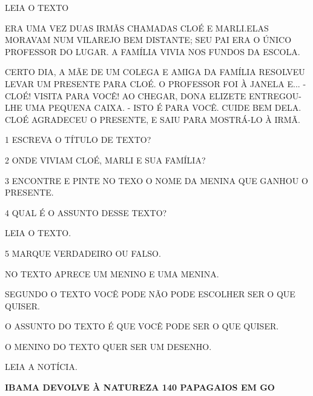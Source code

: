 \begin{escola}
LEIA O TEXTO


ERA UMA VEZ DUAS IRMÃS CHAMADAS CLOÉ E MARLI.ELAS MORAVAM NUM VILAREJO
BEM DISTANTE; SEU PAI ERA O ÚNICO PROFESSOR DO LUGAR. A FAMÍLIA VIVIA
NOS FUNDOS DA ESCOLA.

CERTO DIA, A MÃE DE UM COLEGA E AMIGA DA FAMÍLIA RESOLVEU LEVAR UM
PRESENTE PARA CLOÉ. O PROFESSOR FOI À JANELA E... - CLOÉ! VISITA PARA
VOCÊ! AO CHEGAR, DONA ELIZETE ENTREGOU-LHE UMA PEQUENA CAIXA. - ISTO É
PARA VOCÊ. CUIDE BEM DELA. CLOÉ AGRADECEU O PRESENTE, E SAIU PARA
MOSTRÁ-LO À IRMÃ.


\num{1} ESCREVA O TÍTULO DE TEXTO?


\num{2} ONDE VIVIAM CLOÉ, MARLI E SUA FAMÍLIA?


\num{3} ENCONTRE E PINTE NO TEXO O NOME DA MENINA QUE GANHOU O PRESENTE.

\num{4} QUAL É O ASSUNTO DESSE TEXTO?


LEIA O TEXTO.



\num{5} MARQUE VERDADEIRO OU FALSO.

\begin{boxlist}
\item NO TEXTO APRECE UM MENINO E UMA MENINA.

\item SEGUNDO O TEXTO VOCÊ PODE NÃO PODE ESCOLHER SER O QUE QUISER.

\item O ASSUNTO DO TEXTO É QUE VOCÊ PODE SER O QUE QUISER.

\item O MENINO DO TEXTO QUER SER UM DESENHO.
\end{boxlist}

LEIA A NOTÍCIA.

\textbf{IBAMA DEVOLVE À NATUREZA 140 PAPAGAIOS EM GO}


\end{escola}
